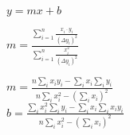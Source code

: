 \documentclass[a4paper, ngerman]{scrartcl}
\begin{document}
	$y=mx+b$
	
	\vspace{1cm}
	
	$m=\frac{\sum_{i=1}^{n}\frac{x_i \cdot y_i}{\left(\Delta y_i\right)^2}}{\sum_{i=1}^{n}\frac{x_i^2}{\left(\Delta y_i\right)^2}}$
	
	\vspace{1cm}
	
	

	$m = \frac{n\sum_i x_i y_i - \sum_i x_i \sum_i y_i}{n\sum_i x_i^2 - \left( \sum_i x_i\right)^2} $\\
		$b = \frac{\sum_i x_i^2 \sum_i y_i - \sum_i x_i \sum_i x_i y_i}{n\sum_i x_i^2 - \left( \sum_i x_i\right)^2}$
	
	
	
\end{document}

